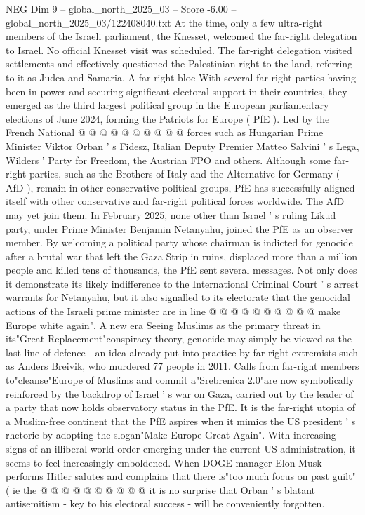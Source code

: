 \begin{textsample}{NEG Dim 9 – global\_north\_2025\_03 – Score -6.00 – global\_north\_2025\_03/122408040.txt}
At the time, only a few ultra-right members of the Israeli parliament, the Knesset, welcomed the far-right delegation to Israel.
No official Knesset visit was scheduled.
The far-right delegation visited settlements and effectively questioned the Palestinian right to the land, referring to it as Judea and Samaria.
A far-right bloc With several far-right parties having been in power and securing significant electoral support in their countries, they emerged as the third largest political group in the European parliamentary elections of June 2024, forming the Patriots for Europe ( PfE ).
Led by the French National @ @ @ @ @ @ @ @ @ @ forces such as Hungarian Prime Minister Viktor Orban ' s Fidesz, Italian Deputy Premier Matteo Salvini ' s Lega, Wilders ' Party for Freedom, the Austrian FPO and others.
Although some far-right parties, such as the Brothers of Italy and the Alternative for Germany ( AfD ), remain in other conservative political groups, PfE has successfully aligned itself with other conservative and far-right political forces worldwide.
The AfD may yet join them.
In February 2025, none other than Israel ' s ruling Likud party, under Prime Minister Benjamin Netanyahu, joined the PfE as an observer member.
By welcoming a political party whose chairman is indicted for genocide after a brutal war that left the Gaza Strip in ruins, displaced more than a million people and killed tens of thousands, the PfE sent several messages.
Not only does it demonstrate its likely indifference to the International Criminal Court ' s arrest warrants for Netanyahu, but it also signalled to its electorate that the genocidal actions of the Israeli prime minister are in line @ @ @ @ @ @ @ @ @ @ make Europe white again".
A new era Seeing Muslims as the primary threat in its"Great Replacement"conspiracy theory, genocide may simply be viewed as the last line of defence - an idea already put into practice by far-right extremists such as Anders Breivik, who murdered 77 people in 2011.
Calls from far-right members to"cleanse"Europe of Muslims and commit a"Srebrenica 2.0"are now symbolically reinforced by the backdrop of Israel ' s war on Gaza, carried out by the leader of a party that now holds observatory status in the PfE.
It is the far-right utopia of a Muslim-free continent that the PfE aspires when it mimics the US president ' s rhetoric by adopting the slogan"Make Europe Great Again".
With increasing signs of an illiberal world order emerging under the current US administration, it seems to feel increasingly emboldened.
When DOGE manager Elon Musk performs Hitler salutes and complains that there is"too much focus on past guilt"( ie the @ @ @ @ @ @ @ @ @ @ it is no surprise that Orban ' s blatant antisemitism - key to his electoral success - will be conveniently forgotten.

\end{textsample}
